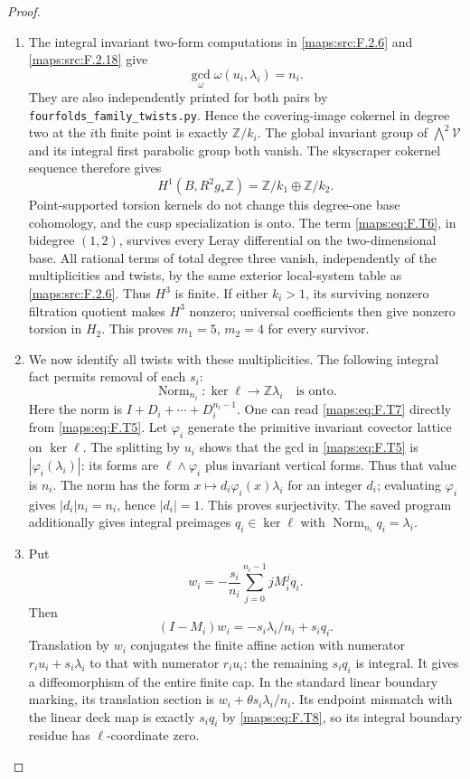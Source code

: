 \documentclass[11pt,a4paper]{article}
\theoremstyle{definition}
\begin{document}
\begin{proof}
\begin{enumerate}[label=\arabic*.]
\item The integral invariant two-form computations in \ref{maps:src:F.2.6} and
\ref{maps:src:F.2.18} give
\[
 \gcd_{\omega}\omega(u_i,\lambda_i)=n_i.
 \tag{F.T5}\label{maps:eq:F.T5}
\]
They are also independently printed for both pairs by
\texttt{fourfolds\_family\_twists.py}.
Hence the covering-image cokernel in degree two at the
$i$th finite point is exactly $\mathbb Z/k_i$.
The global invariant group of $\bigwedge^2\mathcal V$
and its integral first parabolic group both vanish.
The skyscraper cokernel sequence therefore gives
\[
 H^1(B,R^2g_*\mathbb Z)
       =\mathbb Z/k_1\oplus\mathbb Z/k_2.
 \tag{F.T6}\label{maps:eq:F.T6}
\]
Point-supported torsion kernels do not change this degree-one
base cohomology, and the cusp specialization is onto.
The term \eqref{maps:eq:F.T6}, in bidegree $(1,2)$, survives every Leray
differential on the two-dimensional base.
All rational terms of total degree three vanish, independently
of the multiplicities and twists, by the same exterior
local-system table as \ref{maps:src:F.2.6}.  Thus $H^3$ is finite.
If either $k_i>1$, its surviving nonzero filtration quotient
makes $H^3$ nonzero; universal coefficients then give
nonzero torsion in $H_2$.
This proves $m_1=5$, $m_2=4$ for every survivor.

\item We now identify all twists with these multiplicities.
The following integral fact permits removal of each $s_i$:
\[
 \operatorname{Norm}_{n_i}:
 \ker\ell\longrightarrow\mathbb Z\lambda_i
 \quad\text{is onto}.
 \tag{F.T7}\label{maps:eq:F.T7}
\]
Here the norm is $I+D_i+\cdots+D_i^{n_i-1}$.
One can read \eqref{maps:eq:F.T7} directly from \eqref{maps:eq:F.T5}.
Let $\varphi_i$ generate the primitive invariant covector
lattice on $\ker\ell$.
The splitting by $u_i$ shows that the gcd in \eqref{maps:eq:F.T5} is
$|\varphi_i(\lambda_i)|$: its forms are
$\ell\wedge\varphi_i$ plus invariant vertical forms.
Thus that value is $n_i$.
The norm has the form
$x\mapsto d_i\varphi_i(x)\lambda_i$ for an integer
$d_i$; evaluating $\varphi_i$ gives
$|d_i|n_i=n_i$, hence $|d_i|=1$.
This proves surjectivity.  The saved program additionally
gives integral preimages $q_i\in\ker\ell$ with
$\operatorname{Norm}_{n_i}q_i=\lambda_i$.

\item Put
\[
 w_i=-\frac{s_i}{n_i}\sum_{j=0}^{n_i-1}jM_i^j q_i.
\]
Then
\[
 (I-M_i)w_i=-s_i\lambda_i/n_i+s_iq_i.
 \tag{F.T8}\label{maps:eq:F.T8}
\]
Translation by $w_i$ conjugates the finite affine action
with numerator $r_i u_i+s_i\lambda_i$ to that with
numerator $r_i u_i$: the remaining $s_iq_i$ is integral.
It gives a diffeomorphism of the entire finite cap.
In the standard linear boundary marking, its translation
section is
$w_i+\theta s_i\lambda_i/n_i$.
Its endpoint mismatch with the linear deck map is exactly
$s_iq_i$ by \eqref{maps:eq:F.T8}, so its integral boundary residue has
$\ell$-coordinate zero.


\end{enumerate}
\end{proof}
\end{document}
